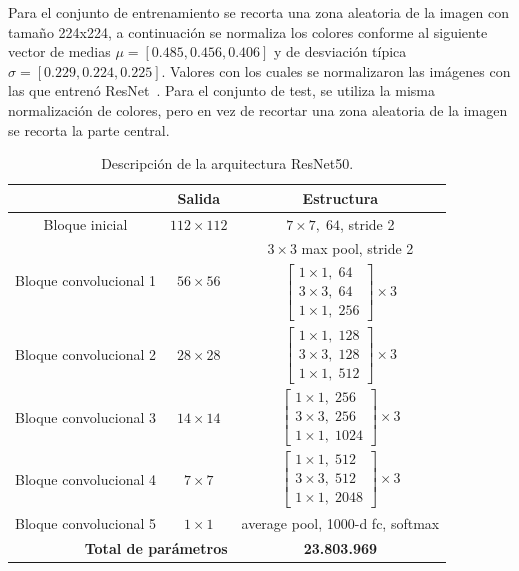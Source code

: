 Para el conjunto de entrenamiento se recorta una zona aleatoria de la imagen con 
tamaño 224x224, a continuación se normaliza los colores conforme al siguiente 
vector de medias $\mu = \left[ 0.485, 0.456, 0.406 \right]$ y de desviación típica
$\sigma = \left[ 0.229, 0.224, 0.225 \right]$. Valores con los cuales se 
normalizaron las imágenes con las que entrenó ResNet~\cite{ResNet}.
Para el conjunto de test, se utiliza la misma normalización de colores, pero 
en vez de recortar una zona aleatoria de la imagen se recorta la parte central. 

\bgroup
\begin{table}[htp]
  \scriptsize
  \begin{center}
    \begin{tabular}[b]{|c|c|c|}
      \hline
      \rowcolor[HTML]{FFC702}
      \multicolumn{1}{|c|}{\textbf{Capa}} & \multicolumn{1}{c|}{\textbf{Salida}}  &
      \multicolumn{1}{c|}{\textbf{Estructura}} \\
      \hline
      Bloque inicial & $112\times112$ & $7\times7,\; 64$, stride 2 \\ 
      \hline 
      \multirow{2}{*}{Bloque convolucional 1} & \multirow{2}{*}{$56\times56$} & $3\times3$ max pool, stride 2 \\ 
      \cline{3-3}
                                              & & $\begin{bmatrix}1\times1,\; 64 \\ 3\times3,\; 64 \\ 1\times1,\; 256 \end{bmatrix}\times 3$ \\ 
      \hline
      Bloque convolucional 2 & $28\times28$ & $\begin{bmatrix}1\times1,\; 128 \\ 3\times3,\; 128 \\ 1\times1,\; 512 \end{bmatrix}  \times 3 $\\ 
      \hline
      Bloque convolucional 3 & $14\times14$ & $\begin{bmatrix}1\times1,\; 256 \\ 3\times3,\; 256 \\ 1\times1,\; 1024 \end{bmatrix} \times 3$ \\ 
      \hline
      Bloque convolucional 4 & $7\times7$   & $\begin{bmatrix}1\times1,\; 512 \\ 3\times3,\; 512 \\ 1\times1,\; 2048 \end{bmatrix}  \times 3 $\\ 
      \hline
      Bloque convolucional 5 & $1\times1$   & average pool, 1000-d fc, softmax\\ 
      \hline
      \multicolumn{2}{|r|}{\cellcolor[HTML]{FFC702}\textbf{Total de parámetros}} & \textbf{23.803.969}\\
      \hline 
      \end{tabular}
  \end{center}
  \caption{Descripción de la arquitectura ResNet50.}
  \label{tab:ResNet50}
\end{table}
